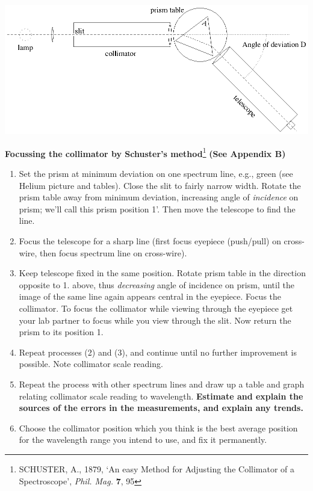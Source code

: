 \documentclass[12pt]{article}
\begin{document}
\begin{center}
\includegraphics{ap3labspec1.ps}
\end{center}

{\large {\bf Focussing the collimator by Schuster's method}\footnote{SCHUSTER, A., 1879, `An easy Method for Adjusting the Collimator of a Spectroscope',  {\sl Phil. Mag.} {\bf 7}, 95} {\bf (See Appendix B)}}

\begin{enumerate}
\item Set the prism at minimum deviation on one spectrum line, e.g., green (see Helium picture and tables).  Close the slit to fairly narrow width. Rotate the prism table away from minimum deviation, increasing angle of {\em incidence} on  prism; we'll call this prism position 1'. Then move the telescope to find the line.

\item Focus the telescope for a sharp line (first focus eyepiece (push/pull) on cross-wire, then  focus spectrum line on cross-wire).

\item Keep telescope fixed in the same position. Rotate prism table in the direction opposite to 1. above, thus {\em decreasing\/} angle of incidence on  prism, until the image of the same line again appears central in the eyepiece.  Focus the collimator.  To focus the collimator while viewing through the eyepiece get your lab partner to focus while you view through the slit. Now return the prism to its position 1. 

\item Repeat processes (2) and (3), and continue until no further improvement is possible.   Note collimator scale reading.

\item Repeat the process with other spectrum lines and draw up a table and graph relating collimator scale reading to wavelength. {\bf Estimate and explain the sources of the errors in the measurements, and explain any trends.}

\item Choose the collimator position which you think is the best average position for the  wavelength range you intend to use, and fix it permanently.
\end{enumerate}
\end{document}
